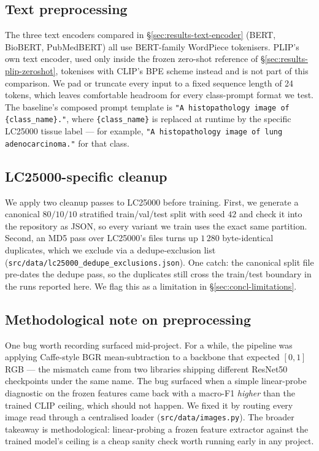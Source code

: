\subsection{Text preprocessing}

The three text encoders compared in §\ref{sec:results-text-encoder} (BERT, BioBERT, PubMedBERT) all use BERT-family WordPiece tokenisers. PLIP's own text encoder, used only inside the frozen zero-shot reference of §\ref{sec:results-plip-zeroshot}, tokenises with CLIP's BPE scheme instead and is not part of this comparison. We pad or truncate every input to a fixed sequence length of 24 tokens, which leaves comfortable headroom for every class-prompt format we test. The baseline's composed prompt template is \texttt{"A histopathology image of \{class\_name\}."}, where \texttt{\{class\_name\}} is replaced at runtime by the specific LC25000 tissue label --- for example, \texttt{"A histopathology image of lung adenocarcinoma."} for that class.

\subsection{LC25000-specific cleanup}

We apply two cleanup passes to LC25000 before training. First, we generate a canonical $80/10/10$ stratified train/val/test split with seed $42$ and check it into the repository as JSON, so every variant we train uses the exact same partition. Second, an MD5 pass over LC25000's files turns up $1\,280$ byte-identical duplicates, which we exclude via a dedupe-exclusion list (\texttt{src/data/lc25000\_dedupe\_exclusions.json}). One catch: the canonical split file pre-dates the dedupe pass, so the duplicates still cross the train/test boundary in the runs reported here. We flag this as a limitation in §\ref{sec:concl-limitations}.

\subsection{Methodological note on preprocessing}
\label{sec:meth-preprocessing-bug}

One bug worth recording surfaced mid-project. For a while, the pipeline was applying Caffe-style BGR mean-subtraction to a backbone that expected $[0, 1]$ RGB --- the mismatch came from two libraries shipping different ResNet50 checkpoints under the same name. The bug surfaced when a simple linear-probe diagnostic on the frozen features came back with a macro-F1 \emph{higher} than the trained CLIP ceiling, which should not happen. We fixed it by routing every image read through a centralised loader (\texttt{src/data/images.py}). The broader takeaway is methodological: linear-probing a frozen feature extractor against the trained model's ceiling is a cheap sanity check worth running early in any project.


